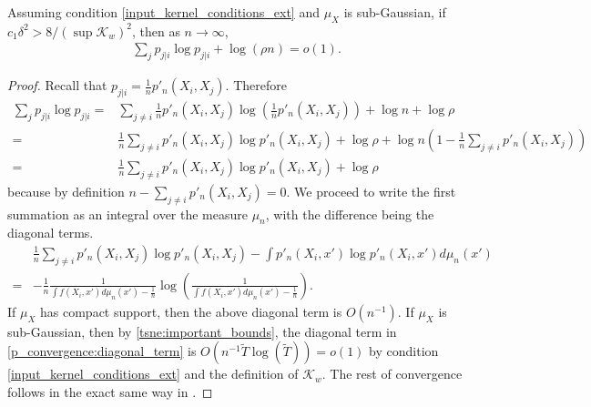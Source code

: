\begin{lemma}
    Assuming condition \ref{input_kernel_conditions_ext} and $\mu_X$ is sub-Gaussian, if $c_1\delta^2 > 8/(\sup \mathcal{K}_w)^2$, then as $n \to \infty$,
    \begin{align}
        \sum_j p_{j|i} \log p_{j|i} + \log(\rho n) = o(1).
    \end{align}
\end{lemma}
\begin{proof}
    Recall that $p_{j|i} = \frac{1}{n}p'_n(X_i,X_j)$. Therefore
    \begin{align}
        \sum_j p_{j|i} \log p_{j|i} = & \sum_{j \neq i} \frac{1}{n}p'_n(X_i,X_j) \log \left(\frac{1}{n}p'_n(X_i,X_j) \right ) + \log n + \log \rho \nonumber                                  \\
        =                             & \frac{1}{n} \sum_{j \neq i} p'_n(X_i,X_j) \log p'_n(X_i,X_j) + \log \rho + \log n \left(1 - \frac{1}{n}\sum_{j \neq i} p'_n(X_i,X_j)\right) \nonumber \\
        =                             & \frac{1}{n} \sum_{j \neq i} p'_n(X_i,X_j) \log p'_n(X_i,X_j) + \log \rho
    \end{align}
    because by definition $n - \sum_{j \neq i} p'_n(X_i,X_j) = 0$. We proceed to write the first summation as an integral over the measure $\mu_n$, with the difference being the diagonal terms.
    \begin{align} \label{p_convergence:diagonal_term}
          & \frac{1}{n} \sum_{j \neq i} p'_n(X_i,X_j) \log p'_n(X_i,X_j) - \int p'_n(X_i,x') \log p'_n(X_i,x') d\mu_n(x') \nonumber     \\
        = & -\frac{1}{n}\frac{1}{\int f(X_i,x')d\mu_n(x')-\frac{1}{n}}\log \left(\frac{1}{\int f(X_i,x')d\mu_n(x')-\frac{1}{n}}\right).
    \end{align}
    If $\mu_X$ has compact support, then the above diagonal term is $O(n^{-1})$. If $\mu_X$ is sub-Gaussian, then by \eqref{tsne:important_bounds}, the diagonal term in \eqref{p_convergence:diagonal_term} is $O(n^{-1}\tilde{T}\log(\tilde{T})) = o(1)$ by condition \ref{input_kernel_conditions_ext} and the definition of $\mathcal{K}_w$. The rest of convergence follows in the exact same way in \cite{auffinger-tsne}.
\end{proof}
